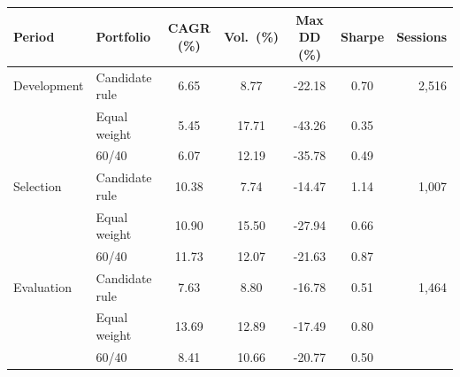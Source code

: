 \begin{tabular}{@{}llS[table-format=2.2]S[table-format=2.2]S[table-format=-2.2]S[table-format=1.2]r@{}}
\toprule
Period & Portfolio & {CAGR (\%)} & {Vol.\ (\%)} & {Max DD (\%)} & {Sharpe} & Sessions \\
\midrule
Development & Candidate rule & 6.65 & 8.77 & -22.18 & 0.70 & 2,516 \\
 & Equal weight & 5.45 & 17.71 & -43.26 & 0.35 &  \\
 & 60/40 & 6.07 & 12.19 & -35.78 & 0.49 &  \\
\midrule
Selection & Candidate rule & 10.38 & 7.74 & -14.47 & 1.14 & 1,007 \\
 & Equal weight & 10.90 & 15.50 & -27.94 & 0.66 &  \\
 & 60/40 & 11.73 & 12.07 & -21.63 & 0.87 &  \\
\midrule
Evaluation & Candidate rule & 7.63 & 8.80 & -16.78 & 0.51 & 1,464 \\
 & Equal weight & 13.69 & 12.89 & -17.49 & 0.80 &  \\
 & 60/40 & 8.41 & 10.66 & -20.77 & 0.50 &  \\
\bottomrule
\end{tabular}
